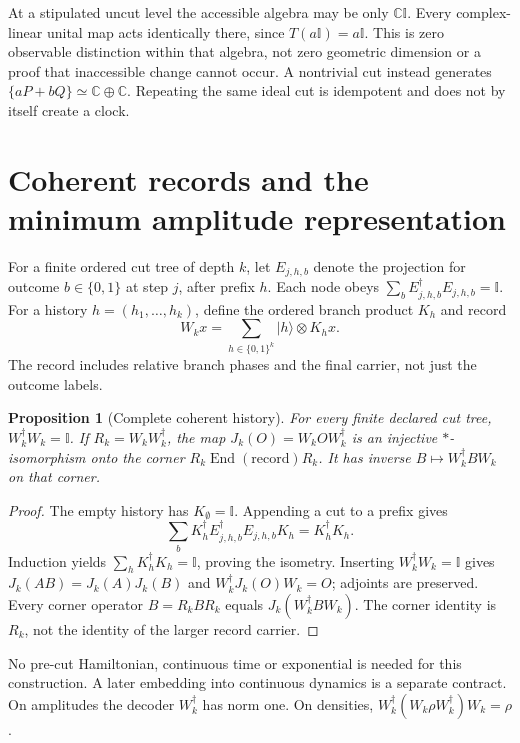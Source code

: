 \documentclass[11pt,a4paper]{article}
\newtheorem{proposition}[theorem]{Proposition}
\newcommand{\adj}{\dagger}
\newcommand{\Id}{\mathbb I}
\begin{document}
At a stipulated uncut level the accessible algebra may be only
$\mathbb C\Id$. Every complex-linear unital map acts identically there,
since $T(a\Id)=a\Id$. This is zero observable distinction within that
algebra, not zero geometric dimension or a proof that inaccessible change
cannot occur. A nontrivial cut instead generates
$\{aP+bQ\}\simeq\mathbb C\oplus\mathbb C$. Repeating the same ideal cut is
idempotent and does not by itself create a clock.

\section{Coherent records and the minimum amplitude representation}

For a finite ordered cut tree of depth $k$, let $E_{j,h,b}$ denote the
projection for outcome $b\in\{0,1\}$ at step $j$, after prefix $h$.
Each node obeys $\sum_b E_{j,h,b}^\adj E_{j,h,b}=\Id$. For a history
$h=(h_1,\ldots,h_k)$, define the ordered branch product $K_h$ and record
\begin{equation}\label{eq:history}
W_kx=\sum_{h\in\{0,1\}^k}|h\rangle\otimes K_hx.
\end{equation}
The record includes relative branch phases and the final carrier, not just
the outcome labels.

\begin{proposition}[Complete coherent history]\label{thm:history}
For every finite declared cut tree, $W_k^\adj W_k=\Id$. If
$R_k=W_kW_k^\adj$, the map $J_k(O)=W_kOW_k^\adj$ is an injective
$*$-isomorphism onto the corner $R_k\operatorname{End}(\mathrm{record})R_k$.
It has inverse $B\mapsto W_k^\adj BW_k$ on that corner.
\end{proposition}
\begin{proof}
The empty history has $K_\emptyset=\Id$. Appending a cut to a prefix gives
\[
\sum_b K_h^\adj E_{j,h,b}^\adj E_{j,h,b}K_h=K_h^\adj K_h.
\]
Induction yields $\sum_h K_h^\adj K_h=\Id$, proving the isometry.
Inserting $W_k^\adj W_k=\Id$ gives
$J_k(AB)=J_k(A)J_k(B)$ and $W_k^\adj J_k(O)W_k=O$; adjoints are preserved.
Every corner operator $B=R_kBR_k$ equals
$J_k(W_k^\adj BW_k)$. The corner identity is $R_k$, not the identity of
the larger record carrier.
\end{proof}

No pre-cut Hamiltonian, continuous time or exponential is needed for this
construction. A later embedding into continuous dynamics is a separate
contract. On amplitudes the decoder $W_k^\adj$ has norm one. On densities,
$W_k^\adj(W_k\rho W_k^\adj)W_k=\rho$.
\end{document}
